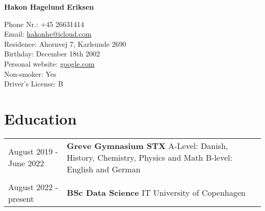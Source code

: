 \documentclass[12pt]{article}
\begin{document}
\begin{center}
     \Huge{\textbf{Hakon Hagelund Eriksen}}
\end{center}
Phone Nr.: \hfill +45 26631414\\
Email:  \hfill \href{mailto:hakonhe@icloud.com}{hakonhe@icloud.com} \\ 
Residence: \hfill Ahornvej 7, Karlsunde 2690 \\
Birthday: \hfill December 18th 2002 \\
Personal website: \hfill \href{google.com}{google.com} \\
Non-smoker: \hfill Yes \\
Driver's License: \hfill B


\section{Education}
\begin{tabular}{ l p{6in} }
August 2019 -  June 2022 & \textbf{Greve Gymnasium STX } \newline A-Level: Danish, History, Chemistry, Physics and Math \newline B-level: English and German \\
& \\
August 2022 - present & \textbf{BSc Data Science} \newline IT University of Copenhagen \\ 
\end{tabular}
\end{document}
